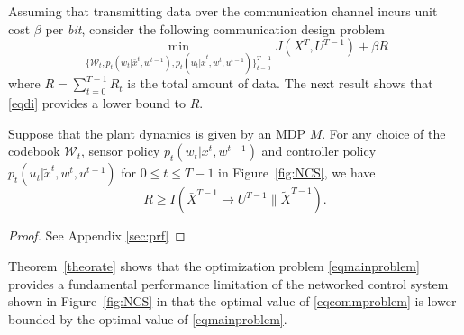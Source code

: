 Assuming that transmitting data over the communication channel incurs unit cost $\beta$ per \emph{bit}, consider the following communication design problem
\begin{equation}
\min_{\{\mathcal{W}_t, p_t(w_t|\bar{x}^t, w^{t-1}), p_t(u_t|\tilde{x}^t, w^t, u^{t-1}) \}_{t=0}^{T-1}}  J(X^T, U^{T-1}) +\beta R \label{eqcommproblem}
\end{equation}
where $R=\sum_{t=0}^{T-1}R_t$ is the total amount of data. 
The next result shows that \eqref{eqdi} provides a lower bound to $R$.
\begin{theorem}
\label{theorate}
Suppose that the plant dynamics is given by an MDP $M$. For any choice of the codebook $\mathcal{W}_t$, sensor policy $p_t(w_t|\bar{x}^t, w^{t-1})$ and controller policy $p_t(u_t|\tilde{x}^t, w^t, u^{t-1})$ for $0\leq t\leq T-1$ in Figure~\ref{fig:NCS}, we have
\[
R \geq I(\bar{X}^{T-1}\rightarrow U^{T-1}\| \tilde{X}^{T-1}).
\]
\end{theorem}
\begin{proof}
See Appendix \ref{sec:prf}
\end{proof}
Theorem~\ref{theorate} shows that the optimization problem \eqref{eqmainproblem} provides a fundamental performance limitation of the networked control system shown in Figure~\ref{fig:NCS} in that the optimal value of \eqref{eqcommproblem} is lower bounded by the optimal value of \eqref{eqmainproblem}.
%
%


